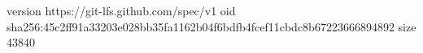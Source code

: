 version https://git-lfs.github.com/spec/v1
oid sha256:45c2ff91a33203e028bb35fa1162b04f6bdfb4fcef11cbdc8b67223666894892
size 43840
